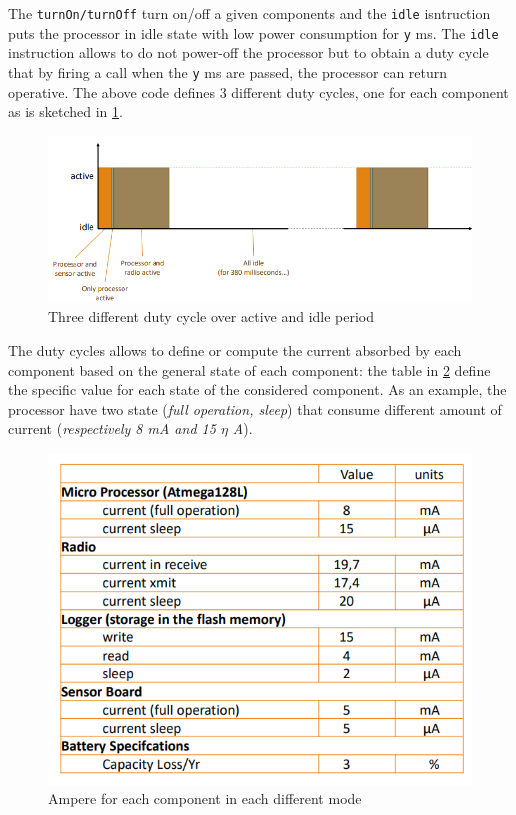\documentclass[10pt,a4paper]{report}
\theoremstyle{definition}
\begin{document}
The \texttt{turnOn/turnOff} turn on/off a given components and the \texttt{idle} isntruction puts the processor in idle state with low power consumption for \texttt{y} ms. The \texttt{idle} instruction allows to do not power-off the processor but to obtain a duty cycle that by firing a call when the \texttt{y} ms are passed, the processor can return operative.
The above code defines 3 different duty cycles, one for each component as is sketched in \ref{3-dc-phases}.
\begin{figure}[h]
	\centering\includegraphics[scale=0.50]{images/Pasted image 20230324171110.png}
	\caption{Three different duty cycle over active and idle period}
	\label{3-dc-phases}
\end{figure}

The duty cycles allows to define or compute the current absorbed by each component based on the general state of each component: the table in \ref{dc-1-table} define the specific value for each state of the considered component. As an example, the processor have two state (\textit{full operation, sleep}) that consume different amount of current (\textit{respectively 8 mA and 15 $\eta$ A}).
\begin{figure}[h]
	\centering\includegraphics[scale=0.40]{images/Pasted image 20230324171214.png}
	\caption{Ampere for each component in each different mode}
	\label{dc-1-table}
\end{figure}
\end{document}
